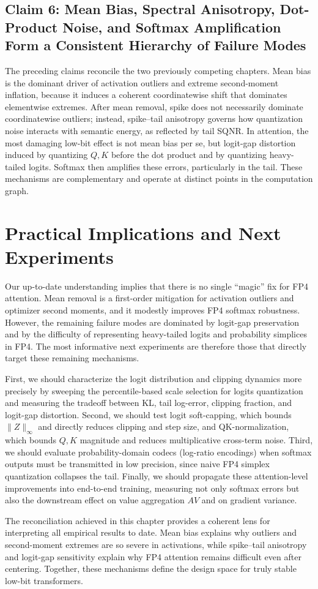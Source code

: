 \subsection{Claim 6: Mean Bias, Spectral Anisotropy, Dot-Product Noise, and Softmax Amplification Form a Consistent Hierarchy of Failure Modes}

The preceding claims reconcile the two previously competing chapters. Mean bias is the dominant driver of activation outliers and extreme second-moment inflation, because it induces a coherent coordinatewise shift that dominates elementwise extremes. After mean removal, spike does not necessarily dominate coordinatewise outliers; instead, spike--tail anisotropy governs how quantization noise interacts with semantic energy, as reflected by tail SQNR. In attention, the most damaging low-bit effect is not mean bias per se, but logit-gap distortion induced by quantizing $Q,K$ before the dot product and by quantizing heavy-tailed logits. Softmax then amplifies these errors, particularly in the tail. These mechanisms are complementary and operate at distinct points in the computation graph.

\section{Practical Implications and Next Experiments}

Our up-to-date understanding implies that there is no single ``magic'' fix for FP4 attention. Mean removal is a first-order mitigation for activation outliers and optimizer second moments, and it modestly improves FP4 softmax robustness. However, the remaining failure modes are dominated by logit-gap preservation and by the difficulty of representing heavy-tailed logits and probability simplices in FP4. The most informative next experiments are therefore those that directly target these remaining mechanisms.

First, we should characterize the logit distribution and clipping dynamics more precisely by sweeping the percentile-based scale selection for logits quantization and measuring the tradeoff between KL, tail log-error, clipping fraction, and logit-gap distortion. Second, we should test logit soft-capping, which bounds $\|Z\|_\infty$ and directly reduces clipping and step size, and QK-normalization, which bounds $Q,K$ magnitude and reduces multiplicative cross-term noise. Third, we should evaluate probability-domain codecs (log-ratio encodings) when softmax outputs must be transmitted in low precision, since naive FP4 simplex quantization collapses the tail. Finally, we should propagate these attention-level improvements into end-to-end training, measuring not only softmax errors but also the downstream effect on value aggregation $AV$ and on gradient variance.

The reconciliation achieved in this chapter provides a coherent lens for interpreting all empirical results to date. Mean bias explains why outliers and second-moment extremes are so severe in activations, while spike--tail anisotropy and logit-gap sensitivity explain why FP4 attention remains difficult even after centering. Together, these mechanisms define the design space for truly stable low-bit transformers.
